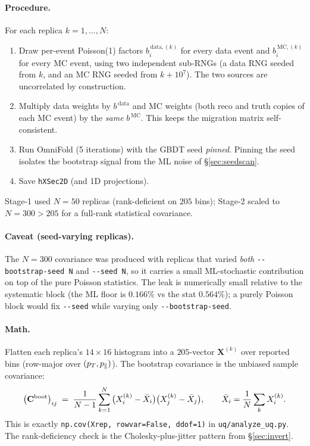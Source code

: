 \paragraph{Procedure.}
For each replica $k=1,\dots,N$:
\begin{enumerate}[nosep]
  \item Draw per-event Poisson(1) factors $b_{i}^{\,\text{data},(k)}$
        for every data event and $b_{i}^{\,\text{MC},(k)}$ for every
        MC event, using two independent sub-RNGs (a data RNG seeded
        from $k$, and an MC RNG seeded from $k + 10^{7}$). The two
        sources are uncorrelated by construction.
  \item Multiply data weights by $b^{\,\text{data}}$ and MC weights
        (both reco and truth copies of each MC event) by the
        \emph{same} $b^{\,\text{MC}}$. This keeps the migration
        matrix self-consistent.
  \item Run OmniFold (5 iterations) with the GBDT seed \emph{pinned}.
        Pinning the seed isolates the bootstrap signal from the ML
        noise of \S\ref{sec:seedscan}.
  \item Save \texttt{hXSec2D} (and 1D projections).
\end{enumerate}
Stage-1 used $N=50$ replicas (rank-deficient on $205$ bins); Stage-2
scaled to $N=300 > 205$ for a full-rank statistical covariance.

\paragraph{Caveat (seed-varying replicas).}
The $N=300$ covariance was produced with replicas that
varied \emph{both} \texttt{-{}-bootstrap-seed N} and \texttt{-{}-seed N},
so it carries a small ML-stochastic contribution on top of the pure
Poisson statistics. The
leak is numerically small relative to the systematic block (the ML
floor is $0.166\%$ vs the stat $0.564\%$); a purely Poisson block would
fix \texttt{-{}-seed} while varying only \texttt{-{}-bootstrap-seed}.

\paragraph{Math.}
Flatten each replica's $14\times16$ histogram into a $205$-vector
$\mathbf{X}^{(k)}$ over reported bins (row-major over $(p_{T},p_{\parallel})$).
The bootstrap covariance is the unbiased sample covariance:
\begin{equation}
\big(\mathbf{C}^{\text{boot}}\big)_{ij}
\;=\;
\frac{1}{N-1}\sum_{k=1}^{N}
\big(X_{i}^{(k)} - \bar X_{i}\big)\big(X_{j}^{(k)} - \bar X_{j}\big),
\qquad
\bar X_{i} = \frac{1}{N}\sum_{k} X_{i}^{(k)}.
\label{eq:bootcov}
\end{equation}
This is exactly \texttt{np.cov(Xrep, rowvar=False, ddof=1)} in
\texttt{uq/analyze\_uq.py}. The rank-deficiency check is the
Cholesky-plus-jitter pattern from \S\ref{sec:invert}.

